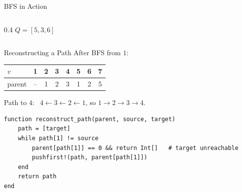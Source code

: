 \documentclass[10pt,aspectratio=169]{beamer}
\begin{document}
\begin{frame}{BFS in Action}
\begin{columns}[c]
\begin{column}{0.4\textwidth}
{               $Q = [5, 3, 6]$}%
    \end{column}
  \end{columns}

  \bigskip
\end{frame}

\begin{frame}[fragile]{Reconstructing a Path}
  After BFS from $1$:
  \begin{center}
  \begin{tabular}{lccccccc}
    \toprule
    $v$ & 1 & 2 & 3 & 4 & 5 & 6 & 7 \\
    \midrule
    parent & -- & 1 & 2 & 3 & 1 & 2 & 5 \\
    \bottomrule
  \end{tabular}
  \end{center}

  \bigskip
  Path to $4$: \ $4 \xleftarrow{} 3 \xleftarrow{} 2 \xleftarrow{} 1$, so
  $1 \to 2 \to 3 \to 4$.

  \bigskip
\begin{lstlisting}
function reconstruct_path(parent, source, target)
    path = [target]
    while path[1] != source
        parent[path[1]] == 0 && return Int[]   # target unreachable
        pushfirst!(path, parent[path[1]])
    end
    return path
end
\end{lstlisting}
\end{frame}
\end{document}
